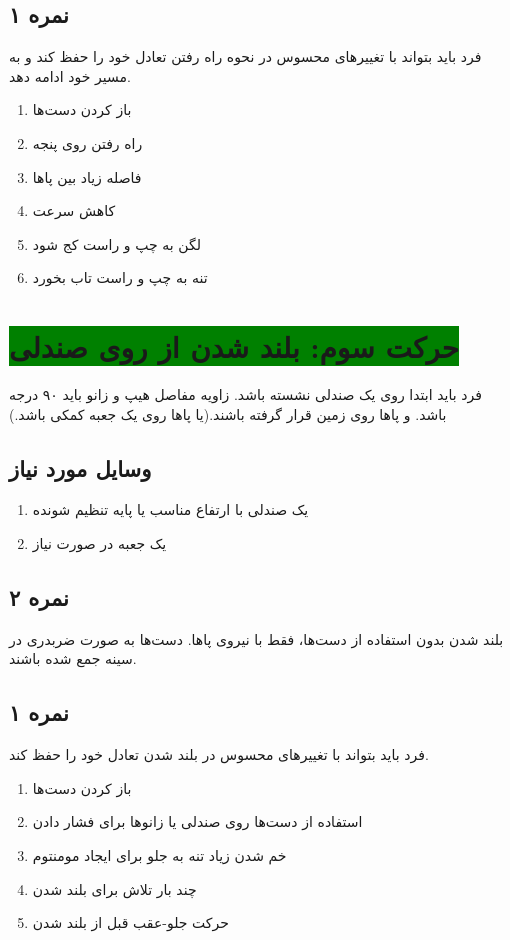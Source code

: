 \documentclass[12pt]{report}
\begin{document}
	\subsection*{نمره ۱}
	فرد باید بتواند با تغییر‌های محسوس در نحوه راه رفتن تعادل خود را حفظ کند و به مسیر خود ادامه دهد.
	\begin{enumerate}
		\item باز کردن دست‌ها
		\item راه رفتن روی پنجه
		\item فاصله زیاد بین پاها
		\item کاهش سرعت
		\item لگن به چپ و راست کج ‌شود
		\item تنه به چپ و راست تاب بخورد
		 
	\end{enumerate}
	\newpage
	
	\section*{\colorbox{green}{حرکت سوم: بلند شدن از روی صندلی}}
	فرد باید ابتدا روی یک صندلی نشسته باشد. زاویه مفاصل هیپ و زانو باید ۹۰ درجه باشد. و پاها روی زمین قرار گرفته باشند.(یا پاها روی یک جعبه کمکی باشد.)
	\subsection*{وسایل مورد نیاز}
	\begin{enumerate}
		\item یک صندلی با ارتفاع مناسب یا پایه تنظیم شونده
		\item یک جعبه در صورت نیاز
	\end{enumerate}
	
	\subsection*{نمره ۲}
	بلند شدن بدون استفاده از دست‌ها، فقط با نیروی پاها. دست‌ها به صورت ضربدری در سینه جمع شده باشند.
	\subsection*{نمره ۱}
	فرد باید بتواند با تغییر‌های محسوس در بلند شدن تعادل خود را حفظ کند.
	\begin{enumerate}
		\item باز کردن دست‌ها
		\item استفاده از دست‌ها روی صندلی یا زانوها برای فشار دادن
		\item خم شدن زیاد تنه به جلو برای ایجاد مومنتوم
		\item چند بار تلاش برای بلند شدن
		\item حرکت جلو-عقب قبل از بلند شدن
	\end{enumerate}
	\newpage
	
\end{document}
